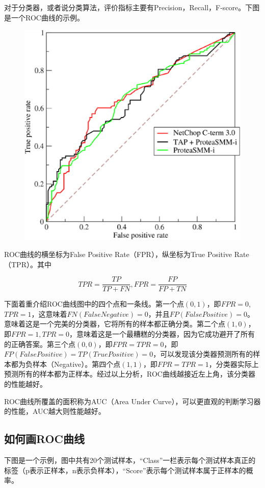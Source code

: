 对于分类器，或者说分类算法，评价指标主要有Precision，Recall，F-score。下图是一个ROC曲线的示例。

 \begin{figure}[h]
   \centering
   \includegraphics[width=.7\textwidth]{imgs/2.40.10.1.eps}
   \label{fig:2.40.10.1}
 \end{figure}

ROC曲线的横坐标为False Positive Rate（FPR），纵坐标为True Positive Rate（TPR）。其中

$$
TPR = \frac{TP}{TP+FN} ,FPR = \frac{FP}{FP+TN}
$$

下面着重介绍ROC曲线图中的四个点和一条线。第一个点$(0,1)$，即$FPR=0$, $TPR=1$，这意味着$FN(False Negative)=0$，并且$FP(False Positive)=0$。意味着这是一个完美的分类器，它将所有的样本都正确分类。第二个点$(1,0)$，即$FPR=1,TPR=0$，意味着这是一个最糟糕的分类器，因为它成功避开了所有的正确答案。第三个点$(0,0)$，即$FPR=TPR=0$，即$FP(False Positive)=TP(True Positive)=0$，可以发现该分类器预测所有的样本都为负样本（Negative）。第四个点$(1,1)$，即$FPR=TPR=1$，分类器实际上预测所有的样本都为正样本。经过以上分析，ROC曲线越接近左上角，该分类器的性能越好。

ROC曲线所覆盖的面积称为AUC（Area Under Curve），可以更直观的判断学习器的性能，AUC越大则性能越好。

\subsection{如何画ROC曲线}

下图是一个示例，图中共有20个测试样本，``Class''一栏表示每个测试样本真正的标签（p表示正样本，n表示负样本），``Score''表示每个测试样本属于正样本的概率。


